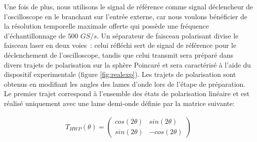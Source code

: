 \begin{onehalfspace}
    \noindent Une fois de plus, nous utilisons le signal 
    de référence comme signal déclencheur de l'oscilloscope en 
    le branchant sur l'entrée externe, car nous voulons bénéficier de la 
    résolution temporelle maximale offerte qui 
    possède une fréquence d’échantillonnage de $500$ $GS/s$. 
    Un séparateur de faisceau polarisant divise 
    le faisceau laser en deux voies : celui réfléchi sert de signal de 
    référence pour le déclenchement de l’oscilloscope, tandis que celui 
    transmit sera préparé dans divers trajets de polarisation sur la 
    sphère Poincaré et sera caractérisé à l'aide du dispositif experimentale 
    (figure \ref{fig:realexp}). 
    Les trajets de polarisation sont obtenus en
    modifiant les angles des lames d'onde lors de 
    l'étape de préparation. Le 
    premier trajet correspond à l'ensemble des états de polarisation 
    linéaire et est réalisé uniquement avec une lame demi-onde définie 
    par la matrice suivante:
\end{onehalfspace}

\begin{align}
    T_{HWP}(\theta) = \begin{pmatrix}
        cos(2\theta) & sin(2\theta)\\
        sin(2\theta) & -cos(2\theta)
    \end{pmatrix}
\end{align}

